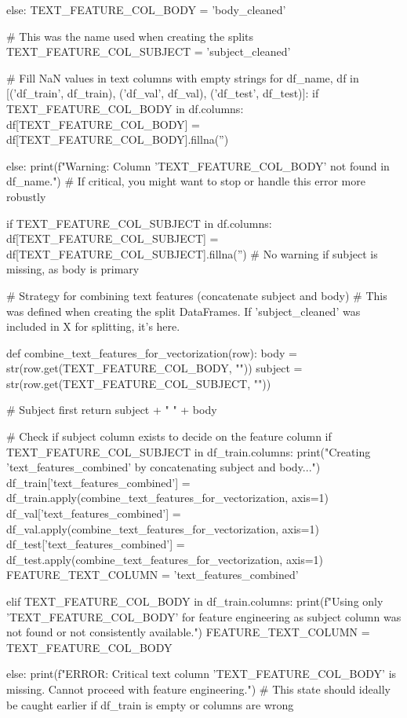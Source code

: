 \begin{ffcode}
else:
    TEXT_FEATURE_COL_BODY = 'body_cleaned'

    # This was the name used when creating the splits
    TEXT_FEATURE_COL_SUBJECT = 'subject_cleaned'

    # Fill NaN values in text columns with empty strings
    for df_name, df in [('df_train', df_train), ('df_val', df_val), ('df_test', df_test)]:
        if TEXT_FEATURE_COL_BODY in df.columns:
            df[TEXT_FEATURE_COL_BODY] = df[TEXT_FEATURE_COL_BODY].fillna('')

        else:
            print(f"Warning: Column '{TEXT_FEATURE_COL_BODY}' not found in {df_name}.")
            # If critical, you might want to stop or handle this error more robustly

        if TEXT_FEATURE_COL_SUBJECT in df.columns:
            df[TEXT_FEATURE_COL_SUBJECT] = df[TEXT_FEATURE_COL_SUBJECT].fillna('')
        # No warning if subject is missing, as body is primary

    # Strategy for combining text features (concatenate subject and body)
    # This was defined when creating the split DataFrames. If 'subject_cleaned' was included in X for splitting, it's here.

    def combine_text_features_for_vectorization(row):
        body = str(row.get(TEXT_FEATURE_COL_BODY, ""))
        subject = str(row.get(TEXT_FEATURE_COL_SUBJECT, ""))

        # Subject first
        return subject + " " + body

    # Check if subject column exists to decide on the feature column
    if TEXT_FEATURE_COL_SUBJECT in df_train.columns:
        print("Creating 'text_features_combined' by concatenating subject and body...")
        df_train['text_features_combined'] = df_train.apply(combine_text_features_for_vectorization, axis=1)
        df_val['text_features_combined'] = df_val.apply(combine_text_features_for_vectorization, axis=1)
        df_test['text_features_combined'] = df_test.apply(combine_text_features_for_vectorization, axis=1)
        FEATURE_TEXT_COLUMN = 'text_features_combined'

    elif TEXT_FEATURE_COL_BODY in df_train.columns:
        print(f"Using only '{TEXT_FEATURE_COL_BODY}' for feature engineering as subject column was not found or not consistently available.")
        FEATURE_TEXT_COLUMN = TEXT_FEATURE_COL_BODY

    else:
        print(f"ERROR: Critical text column '{TEXT_FEATURE_COL_BODY}' is missing. Cannot proceed with feature engineering.")
        # This state should ideally be caught earlier if df_train is empty or columns are wrong


\end{ffcode}
